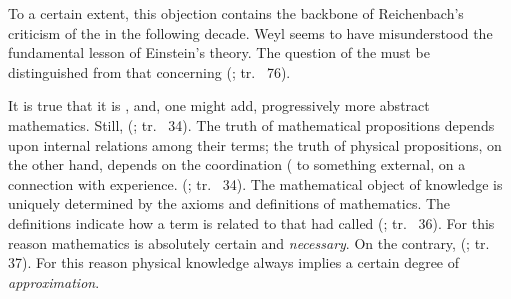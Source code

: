 \documentclass[draft]{article}
\newcommand{\rhp}[2]{(\cite[#1]{Reichenbach1920a}; tr.\ \citeyear{Reichenbach1969} #2)\xspace}
\begin{document}
%
To a certain extent, this objection contains the backbone of Reichenbach's criticism of the \uftp in the following decade. Weyl seems to have misunderstood the fundamental lesson of Einstein's theory. The question of the  must be distinguished from that concerning  \rhp{73}{76}.

It is true that it is , and, one might add, progressively more abstract mathematics. Still,  \rhp{33}{34}. The truth of mathematical propositions depends upon internal relations among their terms; the truth of physical propositions, on the other hand, depends on the coordination ( to something external, on a connection with experience.  \rhp{33}{34}. The mathematical object of knowledge is uniquely determined by the axioms and definitions of mathematics. The definitions indicate how a term is related to that \citet{Schlick1918} had called  \rhp{33}{36}. For this reason mathematics is absolutely certain and \emph{necessary}. On the contrary,  \rhp{34}{37}. For this reason physical knowledge always implies a certain degree of \emph{approximation}.
\end{document}
